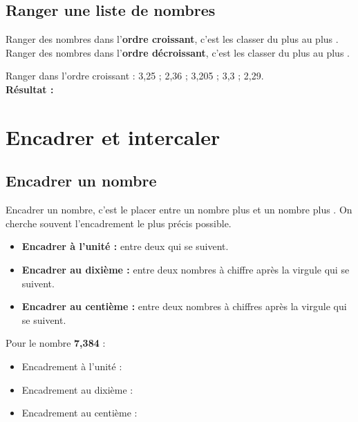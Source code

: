 \subsection{Ranger une liste de nombres}
Ranger des nombres dans l'\textbf{ordre croissant}, c'est les classer du plus  au plus .\\
Ranger des nombres dans l'\textbf{ordre décroissant}, c'est les classer du plus  au plus .\\

\begin{examplebox}
	Ranger dans l'ordre croissant : 3,25 ; 2,36 ; 3,205 ; 3,3 ; 2,29.\\
	\textbf{Résultat :} 
\end{examplebox}

\section{Encadrer et intercaler}

\subsection{Encadrer un nombre}
Encadrer un nombre, c'est le placer entre un nombre plus  et un nombre plus .
On cherche souvent l'encadrement le plus précis possible.\\

\begin{methodebox}
	\begin{itemize}
		\item \textbf{Encadrer à l'unité :} entre deux  qui se suivent.
		\item \textbf{Encadrer au dixième :} entre deux nombres à  chiffre après la virgule qui se suivent.
		\item \textbf{Encadrer au centième :} entre deux nombres à  chiffres après la virgule qui se suivent.
	\end{itemize}
\end{methodebox}

\begin{examplebox}
	Pour le nombre \textbf{7,384} :
	\begin{itemize}
		\item Encadrement à l'unité : \\
		\item Encadrement au dixième : \\
		\item Encadrement au centième : 
	\end{itemize}
\end{examplebox}

